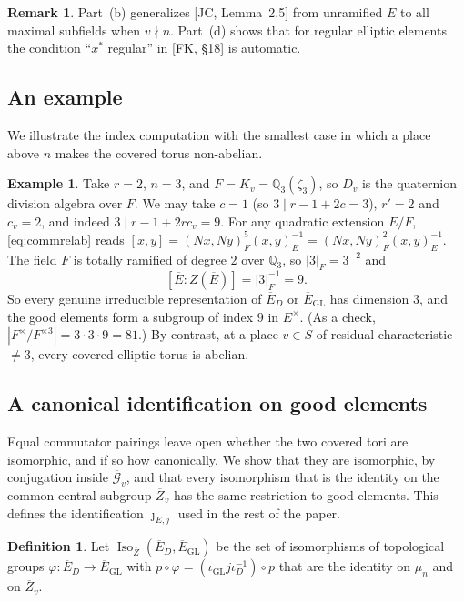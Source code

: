 \documentclass[12pt]{article}
\newcommand{\ov}[1]{\overline{#1}}
\newcommand{\Q}{\mathbb{Q}}
\newcommand{\Iso}{\operatorname{Iso}}
\newcommand{\GL}{\mathrm{GL}}
\newcommand{\Zb}{\ov{Z}}
\newcommand{\Eb}{\ov{E}}
\newcommand{\cGb}{\ov{\mathcal{G}}}
\newcommand{\iD}{\iota_D}
\newcommand{\iG}{\iota_{\GL}}
\newcommand{\jj}{\jmath}
\theoremstyle{plain}
\theoremstyle{definition}
\newtheorem{definition}[theorem]{Definition}
\newtheorem{remark}[theorem]{Remark}
\newtheorem{example}[theorem]{Example}
\begin{document}
\begin{remark}
Part~(b) generalizes [JC, Lemma~2.5] from unramified $E$ to all maximal subfields when $v\nmid n$. Part~(d) shows that for regular elliptic elements the condition ``$x^*$ regular'' in [FK, \S18] is automatic.
\end{remark}

\subsection{An example}\label{subsec:example}
We illustrate the index computation with the smallest case in which a place above $n$ makes the covered torus non-abelian.

\begin{example}\label{ex:r2n3}
Take $r=2$, $n=3$, and $F=K_v=\Q_3(\zeta_3)$, so $D_v$ is the quaternion division algebra over $F$. We may take $c=1$ (so $3\mid r-1+2c=3$), $r'=2$ and $c_v=2$, and indeed $3\mid r-1+2rc_v=9$. For any quadratic extension $E/F$, \eqref{eq:commrelab} reads $[x,y]=(Nx,Ny)_F^{5}(x,y)_E^{-1}=(Nx,Ny)_F^{2}(x,y)_E^{-1}$. The field $F$ is totally ramified of degree $2$ over $\Q_3$, so $|3|_F=3^{-2}$ and
\[ [\Eb:Z(\Eb)]=|3|_F^{-1}=9. \]
So every genuine irreducible representation of $\Eb_D$ or $\Eb_{\GL}$ has dimension $3$, and the good elements form a subgroup of index $9$ in $E^\times$. (As a check, $|F^\times/F^{\times3}|=3\cdot3\cdot9=81$.) By contrast, at a place $v\in S$ of residual characteristic $\ne3$, every covered elliptic torus is abelian.
\end{example}

\subsection{A canonical identification on good elements}\label{subsec:ident}
Equal commutator pairings leave open whether the two covered tori are isomorphic, and if so how canonically. We show that they are isomorphic, by conjugation inside $\cGb_v$, and that every isomorphism that is the identity on the common central subgroup $\Zb_v$ has the same restriction to good elements. This defines the identification $\jj_{E,j}$ used in the rest of the paper.

\begin{definition}
Let $\Iso_{\Zb}(\Eb_D,\Eb_{\GL})$ be the set of isomorphisms of topological groups $\varphi:\Eb_D\to\Eb_{\GL}$ with $p\circ\varphi=(\iG j\iD^{-1})\circ p$ that are the identity on $\mu_n$ and on $\Zb_v$.
\end{definition}
\end{document}
